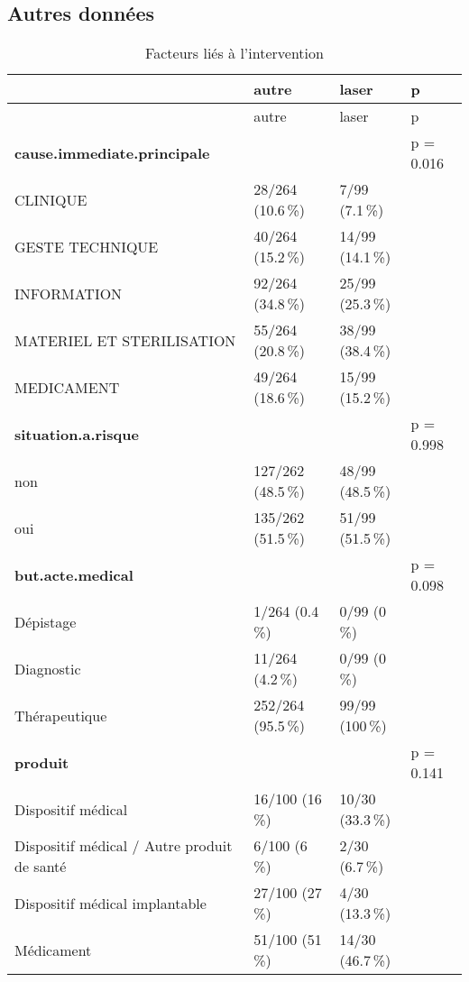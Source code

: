 \documentclass[a4paper,fontsize=10pt,french]{scrartcl}
\begin{document}
\subsection{Autres données}\label{autres-donnuxe9es}



\centering
\begin{longtable}[t]{l|l|l|l}
  \caption{\label{tab:tabcomp}Facteurs liés à l'intervention}\\
 \toprule
  & autre & laser & p\\
  \midrule
  \endfirsthead
 \toprule
  & autre & laser & p\\
  \midrule
  \endhead
  \bottomrule
  \endfoot
    \bottomrule
  \endlastfoot
\textbf{cause.immediate.principale} &  &  & p = 0.016\\
CLINIQUE & 28/264 (10.6\,\%) & 7/99 (7.1\,\%) & \\
GESTE TECHNIQUE & 40/264 (15.2\,\%) & 14/99 (14.1\,\%) & \\
INFORMATION & 92/264 (34.8\,\%) & 25/99 (25.3\,\%) & \\
MATERIEL ET STERILISATION & 55/264 (20.8\,\%) & 38/99 (38.4\,\%) & \\
MEDICAMENT & 49/264 (18.6\,\%) & 15/99 (15.2\,\%) & \\
\midrule
\textbf{situation.a.risque} &  &  & p = 0.998\\
non & 127/262 (48.5\,\%) & 48/99 (48.5\,\%) & \\
oui & 135/262 (51.5\,\%) & 51/99 (51.5\,\%) & \\
\midrule
\textbf{but.acte.medical} &  &  & p = 0.098\\
Dépistage & 1/264 (0.4\,\%) & 0/99 (0\,\%) & \\
Diagnostic & 11/264 (4.2\,\%) & 0/99 (0\,\%) & \\
Thérapeutique & 252/264 (95.5\,\%) & 99/99 (100\,\%) & \\
\midrule
\textbf{produit} &  &  & p = 0.141\\
Dispositif médical & 16/100 (16\,\%) & 10/30 (33.3\,\%) & \\
Dispositif médical / Autre produit de santé & 6/100 (6\,\%) & 2/30 (6.7\,\%) & \\
 
Dispositif médical implantable & 27/100 (27\,\%) & 4/30 (13.3\,\%) & \\
 
Médicament & 51/100 (51\,\%) & 14/30 (46.7\,\%) & \\
 

\end{longtable}
\end{document}
